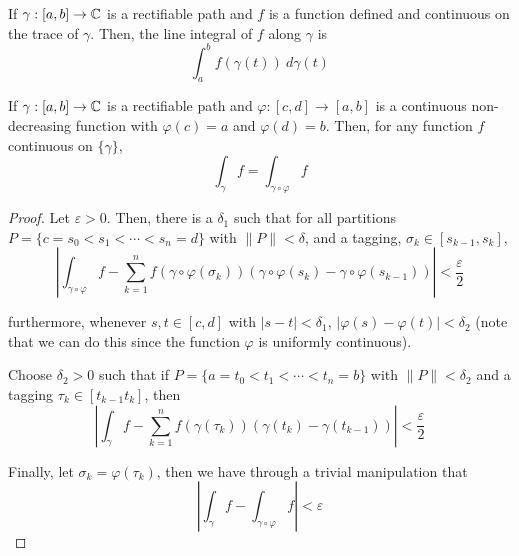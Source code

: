 \begin{definition}
    If $\gamma: [a,b]\to\mathbb{C}$ is a rectifiable path and $f$ is a function defined and continuous on the trace of $\gamma$. Then, the line integral of $f$ along $\gamma$ is 
    \begin{equation*}
        \int_a^bf(\gamma(t))~d\gamma(t)
    \end{equation*}
\end{definition}

\begin{theorem}
    If $\gamma: [a,b]\to\mathbb{C}$ is a rectifiable path and $\varphi: [c,d]\to[a,b]$ is a continuous non-decreasing function with $\varphi(c) = a$ and $\varphi(d) = b$. Then, for any function $f$ continuous on $\{\gamma\}$, 
    \begin{equation*}
        \int_\gamma f = \int_{\gamma\circ\varphi} f
    \end{equation*}
\end{theorem}
\begin{proof}
    Let $\varepsilon > 0$. Then, there is a $\delta_1$ such that for all partitions $P = \{c = s_0 < s_1 < \cdots < s_n = d\}$ with $\|P\| < \delta$, and a tagging, $\sigma_k\in [s_{k - 1}, s_k]$, 
    \begin{equation*}
        \left|\int_{\gamma\circ\varphi}f - \sum_{k = 1}^nf(\gamma\circ\varphi(\sigma_k))(\gamma\circ\varphi(s_k) - \gamma\circ\varphi(s_{k - 1}))\right| < \frac{\varepsilon}{2}
    \end{equation*}

    furthermore, whenever $s,t\in [c,d]$ with $|s - t| < \delta_1$, $|\varphi(s) - \varphi(t)| < \delta_2$ (note that we can do this since the function $\varphi$ is uniformly continuous).

    Choose $\delta_2 > 0$ such that if $P = \{a = t_0 < t_1 < \cdots < t_n = b\}$ with $\|P\| < \delta_2$ and a tagging $\tau_k\in[t_{k - 1} t_k]$, then 
    \begin{equation*}
        \left|\int_\gamma f - \sum_{k = 1}^nf(\gamma(\tau_k))(\gamma(t_k) - \gamma(t_{k - 1}))\right| < \frac{\varepsilon}{2}
    \end{equation*}

    Finally, let $\sigma_k = \varphi(\tau_k)$, then we have through a trivial manipulation that 
    \begin{equation*}
        \left|\int_\gamma f - \int_{\gamma\circ\varphi} f\right| < \varepsilon
    \end{equation*}
\end{proof}


